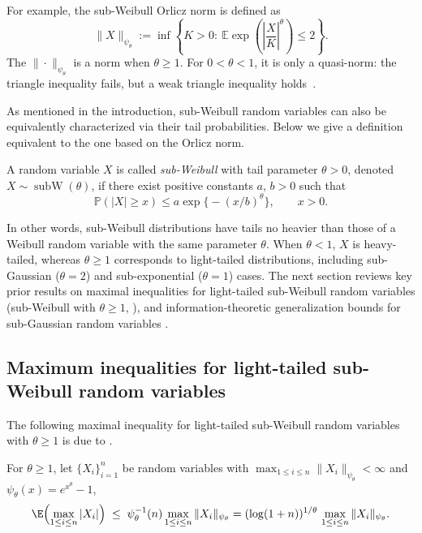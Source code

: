 \documentclass[11pt]{article}
\providecommand{\subw}{\operatorname{subW}}
\begin{document}
For example, the sub-Weibull Orlicz norm is defined as
\[
\|X\|_{\psi_\theta}:=\inf\left\{K>0:\ \mathbb{E}\exp\!\left(\left|\frac{X}{K}\right|^\theta\right)\le 2\right\}.
\]
The $\|\cdot\|_{\psi_\theta}$ is a norm when $\theta\ge 1$. For $0<\theta<1$, it is only a quasi-norm: the triangle inequality fails, but a weak triangle inequality holds~\cite[Lemma A.3]{gotze2021concentration}. 



As mentioned in the introduction, sub-Weibull random variables can also be equivalently characterized via their tail probabilities. Below we give a definition equivalent to the one based on the Orlicz norm.

\begin{definition}\label{def:subweibull}
A random variable $X$ is called \emph{sub-Weibull} with tail parameter $\theta>0$, denoted $X \sim \subw(\theta)$, if there exist positive constants $a,\, b>0$ such that
\[
\mathbb{P}(|X| \ge x) \le a \exp \bigl\{-(x/b)^{\theta}\bigr\}, \qquad x>0.
\]
\end{definition}

In other words, sub-Weibull distributions have tails no heavier than those of a Weibull random variable with the same parameter $\theta$. When $\theta < 1$, $X$ is heavy-tailed, whereas $\theta \ge 1$ corresponds to light-tailed distributions, including sub-Gaussian ($\theta=2$) and sub-exponential ($\theta=1$) cases.  
The next section reviews key prior results on maximal inequalities for light-tailed sub-Weibull random variables (sub-Weibull with $\theta\geq 1$, \cite{Aad2023}), and information-theoretic generalization bounds for sub-Gaussian random variables \citep{Russo20,chu2023unified}.

\subsection{Maximum inequalities for light-tailed sub-Weibull random variables}\label{se:ap-max}

The following maximal inequality for light-tailed sub-Weibull random variables with $\theta\geq 1$ is due to \cite{Aad2023}. 

\begin{proposition}\label{prp-MaximalSW}
For $\theta \ge 1$, let $\{X_{i}\}_{i=1}^n$ be random variables with $\max_{1 \le i \le n}\|X_i\|_{\psi_\theta} < \infty$ and $\psi_\theta(x)=e^{x^\theta}-1$,
\begin{equation}\label{eq:MaximalSW1}
\E \Bigl( \max_{1 \le i \le n} |X_i| \Bigr)
\;\le\; \psi^{-1}_{\theta}(n) \max_{1 \le i \le n}\|X_i\|_{\psi_{\theta}}
= (\log (1+n))^{1 / \theta}\, \max_{1 \le i \le n}\|X_i\|_{\psi_{\theta}}.
\end{equation}
\end{proposition}
\end{document}
